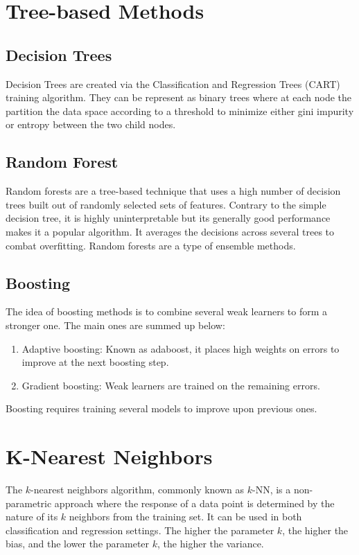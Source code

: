 \documentclass[twoside,twocolumn]{article}
\begin{document}
\section{Tree-based Methods}
\subsection{Decision Trees}
Decision Trees are created via the Classification and Regression Trees (CART)
training algorithm. They can be represent as binary trees where at each node the
partition the data space according to a threshold to minimize either gini impurity
or entropy between the two child nodes.
\subsection{Random Forest}
Random forests are a tree-based technique that uses a high number of decision
trees built out of randomly selected sets of features. Contrary to the simple
decision tree, it is highly uninterpretable but its generally good performance
makes it a popular algorithm. It averages the decisions across several trees
to combat overfitting. Random forests are a type of ensemble methods.
\subsection{Boosting}
The idea of boosting methods is to combine several weak learners to form a
stronger one. The main ones are summed up below:
\begin{enumerate}
  \item Adaptive boosting: Known as adaboost, it places high weights on errors
    to improve at the next boosting step.
  \item Gradient boosting: Weak learners are trained on the remaining errors.
\end{enumerate}
Boosting requires training several models to improve upon previous ones.
\section{K-Nearest Neighbors}
The $k$-nearest neighbors algorithm, commonly known as
$k$-NN, is a non-parametric approach where the response of a data point
is determined by the nature of its $k$ neighbors from the training set.
It can be used in both classification and regression settings.
The higher the parameter $k$, the higher the bias, and the lower the parameter
$k$, the higher the variance.
\end{document}

